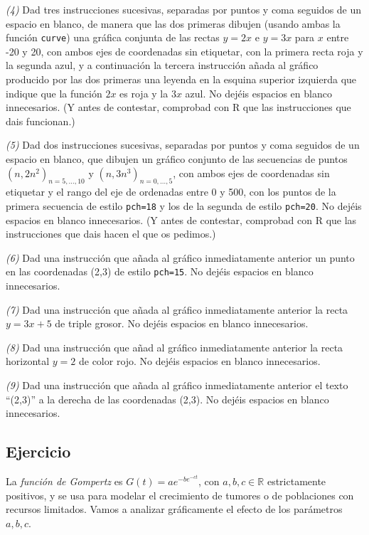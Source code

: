\documentclass[]{book}
\theoremstyle{definition}
\theoremstyle{definition}
\theoremstyle{definition}
\theoremstyle{remark}
\begin{document}
\emph{(4)} Dad tres instrucciones sucesivas, separadas por puntos y coma seguidos de un espacio en blanco, de manera que las dos primeras dibujen (usando ambas la función \texttt{curve}) una gráfica conjunta de las rectas \(y=2x\) e \(y=3x\) para \(x\) entre -20 y 20, con ambos ejes de coordenadas sin etiquetar, con la primera recta roja y la segunda azul, y a continuación la tercera instrucción añada al gráfico producido por las dos primeras una leyenda en la esquina superior izquierda que indique que la función \(2x\) es roja y la \(3x\) azul. No dejéis espacios en blanco innecesarios. (Y antes de contestar, comprobad con R que las instrucciones que dais funcionan.)

\emph{(5)} Dad dos instrucciones sucesivas, separadas por puntos y coma seguidos de un espacio en blanco, que dibujen un gráfico conjunto de las secuencias de puntos \((n,2n^2)_{n=5,\ldots,10}\) y \((n,3n^3)_{n=0,\ldots,5}\), con ambos ejes de coordenadas sin etiquetar y el rango del eje de ordenadas entre 0 y 500, con los puntos de la primera secuencia de estilo \texttt{pch=18} y los de la segunda de estilo \texttt{pch=20}. No dejéis espacios en blanco innecesarios. (Y antes de contestar, comprobad con R que las instrucciones que dais hacen el que os pedimos.)

\emph{(6)} Dad una instrucción que añada al gráfico inmediatamente anterior un punto en las coordenadas (2,3) de estilo \texttt{pch=15}. No dejéis espacios en blanco innecesarios.

\emph{(7)} Dad una instrucción que añada al gráfico inmediatamente anterior la recta \(y=3x+5\) de triple grosor. No dejéis espacios en blanco innecesarios.

\emph{(8)} Dad una instrucción que añad al gráfico inmediatamente anterior la recta horizontal \(y=2\) de color rojo. No dejéis espacios en blanco innecesarios.

\emph{(9)} Dad una instrucción que añada al gráfico inmediatamente anterior el texto ``(2,3)'' a la derecha de las coordenadas (2,3). No dejéis espacios en blanco innecesarios.

\hypertarget{ejercicio-5}{%
\subsection*{Ejercicio}\label{ejercicio-5}}

La \emph{función de Gompertz} es \(G(t)=ae^{-be^{-ct}}\), con \(a, b, c\in \mathbb{R}\) estrictamente positivos, y se usa para modelar
el crecimiento de tumores o de poblaciones con recursos limitados. Vamos a analizar gráficamente el efecto de los parámetros \(a, b, c\).
\end{document}
